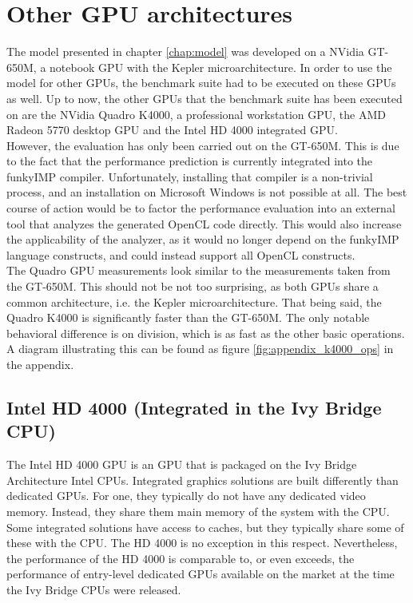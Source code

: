 \section{Other GPU architectures}
\label{sect:future_othergpus}

The model presented in chapter \ref{chap:model} was developed on a NVidia GT-650M, a notebook GPU with the Kepler microarchitecture. In order to use the model for other GPUs, the benchmark suite had to be executed on these GPUs as well. Up to now, the other GPUs that the benchmark suite has been executed on are the NVidia Quadro K4000, a professional workstation GPU, the AMD Radeon 5770 desktop GPU and the Intel HD 4000 integrated GPU. \\

However, the evaluation has only been carried out on the GT-650M. This is due to the fact that the performance prediction is currently integrated into the funkyIMP compiler. Unfortunately, installing that compiler is a non-trivial process, and an installation on Microsoft Windows is not possible at all. The best course of action would be to factor the performance evaluation into an external tool that analyzes the generated OpenCL code directly. This would also increase the applicability of the analyzer, as it would no longer depend on the funkyIMP language constructs, and could instead support all OpenCL constructs. \\  

The Quadro GPU measurements look similar to the measurements taken from the GT-650M. This should not be not too surprising, as both GPUs share a common architecture, i.e. the Kepler microarchitecture. That being said, the Quadro K4000 is significantly faster than the GT-650M. The only notable behavioral difference is on division, which is as fast as the other basic operations. A diagram illustrating this can be found as figure \ref{fig:appendix_k4000_ops} in the appendix.\\


\subsection{Intel HD 4000 (Integrated in the Ivy Bridge CPU)}
\label{sect:future_othergpus_hd4000}
The Intel HD 4000 GPU is an GPU that is packaged on the Ivy Bridge Architecture Intel CPUs. Integrated graphics solutions are built differently than dedicated GPUs. For one, they typically do not have any dedicated video memory. Instead, they share them main memory of the system with the CPU. Some integrated solutions have access to caches, but they typically share some of these with the CPU. The HD 4000 is no exception in this respect. Nevertheless, the performance of the HD 4000 is comparable to, or even exceeds, the performance of entry-level dedicated GPUs available on the market at the time the Ivy Bridge CPUs were released. \cite{xbit2012review} \\

